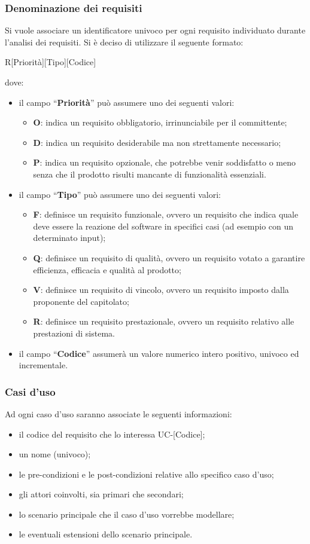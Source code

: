 \documentclass[11pt,a4paper]{article}
\begin{document}
	\subsubsection{Denominazione dei requisiti}
	Si vuole associare un identificatore univoco per ogni requisito individuato durante l'analisi dei requisiti. Si \`e deciso di utilizzare il seguente formato:
	\begin{center}
		R[Priorità][Tipo][Codice]
\end{center}
dove:
\begin{itemize}
\item il campo “\textbf{Priorità}” può assumere uno dei seguenti valori:
\begin{itemize}
	\item \textbf{O}: indica un requisito obbligatorio, irrinunciabile per il committente;
	\item \textbf{D}: indica un requisito desiderabile ma non strettamente necessario;
	\item \textbf{P}: indica un requisito opzionale, che potrebbe venir soddisfatto o meno senza che il prodotto risulti mancante di funzionalità essenziali.
\end{itemize}
\item il campo “\textbf{Tipo}” può assumere uno dei seguenti valori:
\begin{itemize}
	\item \textbf{F}: definisce un requisito funzionale, ovvero un requisito che indica quale deve essere la reazione del software in specifici casi (ad esempio con  un determinato input);
	\item \textbf{Q}: definisce un requisito di qualità, ovvero un requisito votato a garantire efficienza, efficacia e qualità al prodotto;
	\item \textbf{V}: definisce un requisito di vincolo, ovvero un requisito imposto dalla proponente del capitolato;
	\item \textbf{R}: definisce un requisito prestazionale, ovvero un requisito relativo alle prestazioni di sistema.
\end{itemize}
\item il campo “\textbf{Codice}” assumerà un valore numerico intero positivo, univoco ed incrementale.
\end{itemize}

\subsubsection{Casi d'uso}
Ad ogni caso d'uso saranno associate le seguenti informazioni:
\begin{itemize}
\item il codice del requisito che lo interessa UC-[Codice];
\item un nome (univoco);
\item le pre-condizioni e le post-condizioni relative allo specifico caso d'uso;
\item gli attori coinvolti, sia primari che secondari;
\item lo scenario principale che il caso d'uso vorrebbe modellare;
\item le eventuali estensioni dello scenario principale.
\end{itemize}
\end{document}
